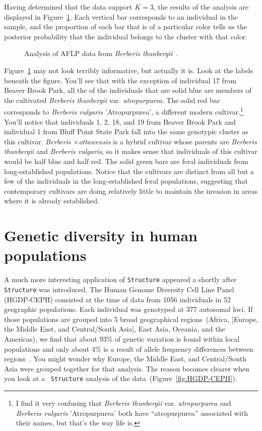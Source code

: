 \documentclass[12pt]{article}
\begin{document}
Having determined that the data support $K=3$, the results of the
analysis are displayed in Figure~\ref{fig:lubell-structure}. Each
vertical bar corresponds to an individual in the sample, and the
proportion of each bar that is of a particular color tells us the
posterior probability that the individual belongs to the cluster with
that color.

\begin{figure}
\caption{Analysis of AFLP data from {\it Berberis
    thunbergii}~\cite{Lubell-etal-2008}.}\label{fig:lubell-structure} 
\end{figure}

Figure~\ref{fig:lubell-structure} may not look terribly informative,
but actually it is. Look at the labels beneath the figure. You'll see
that with the exception of individual 17 from Beaver Brook Park, all
the of the individuals that are solid blue are members of the
cultivated {\it Berberis thunbergii\/} var. {\it atropurpurea}. The
solid red bar corresponds to {\it Berberis vulgaris\/} 'Atropurpurea',
a different modern cultivar.\footnote{I find it very confusing that
  {\it Berberis thunbergii\/} var. {\it atropurpurea\/} and {\it
    Berberis vulgaris\/} 'Atropurpurea' both have ``atropurpurea''
  associated with their names, but that's the way life is.} You'll
notice that individuals 1, 2, 18, and 19 from Beaver Brook Park and
individual 1 from Bluff Point State Park fall into the same genotypic
cluster as this cultivar. {\it Berberis $\times$ottawensis} is a
hybrid cultivar whose parents are {\it Berberis thunbergii\/} and {\it
  Berberis vulgaris\/}, so it makes sense that individuals of this
cultivar would be half blue and half red. The solid green bars are
feral individuals from long-established populations. Notice that the
cultivars are distinct from all but a few of the individuals in the
long-established feral populations, suggesting that contemporary
cultivars are doing relatively little to maintain the invasion in
areas where it is already established.

\section*{Genetic diversity in human populations}

A much more interesting application of {\tt Structure} appeared a
shortly after {\tt Structure} was introduced. The Human Genome
Diversity Cell Line Panel (HGDP-CEPH) consisted at
the time of data from 1056 individuals in 52 geographic
populations. Each individual was genotyped at 377 autosomal loci. If
those populations are grouped into 5 broad geographical
regions~(Africa, [Europe, the Middle East, and Central/South Asia],
East Asia, Oceania, and the Americas), we find that about 93\% of
genetic variation is found within local populations and only about 4\%
is a result of allele frequency differences between
regions~\cite{Rosenberg-etal-2002}. You might wonder why Europe, the
Middle East, and Central/South Asia were grouped together for that
analysis. The reason becomes clearer when you look at a {\tt
  Structure} analysis of the data~(Figure~\ref{fig:HGDP-CEPH}).
\end{document}
